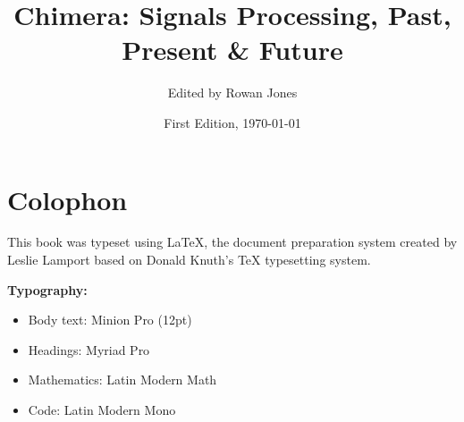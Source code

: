 \documentclass[11pt,oneside]{book}
\title{Chimera: Signals Processing, Past, Present \& Future}
\author{Edited by Rowan Jones}
\date{First Edition, \today}
\begin{document}
\frontmatter

\begin{titlepage}
\thispagestyle{empty}

\end{titlepage}









\tableofcontents
\newpage



\mainmatter



% 
% 
% 



\backmatter

\backmatter

\printbibliography[heading=bibintoc,title={Bibliography}]

\printindex

\chapter*{Colophon}

This book was typeset using \LaTeX{}, the document preparation system created by Leslie Lamport based on Donald Knuth's \TeX{} typesetting system.

\textbf{Typography:}
\begin{itemize}
\item Body text: Minion Pro (12pt)
\item Headings: Myriad Pro
\item Mathematics: Latin Modern Math
\item Code: Latin Modern Mono
\end{itemize}
\end{document}
